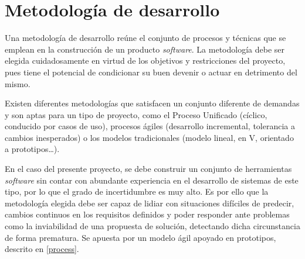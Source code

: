 \section{Metodología de desarrollo}

Una metodología de desarrollo reúne el conjunto de procesos y técnicas que se emplean en la construcción de un producto \textit{software}. La metodología debe ser elegida cuidadosamente en virtud de los objetivos y restricciones del proyecto, pues tiene el potencial de condicionar su buen devenir o actuar en detrimento del mismo.

Existen diferentes metodologías que satisfacen un conjunto diferente de demandas y son aptas para un tipo de proyecto, como el Proceso Unificado (cíclico, conducido por casos de uso), procesos ágiles (desarrollo incremental, tolerancia a cambios inesperados) o los modelos tradicionales (modelo lineal, en V, orientado a prototipos\dots).

En el caso del presente proyecto, se debe construir un conjunto de herramientas \textit{software} sin contar con abundante experiencia en el desarrollo de sistemas de este tipo, por lo que el grado de incertidumbre es muy alto. Es por ello que la metodología elegida debe ser capaz de lidiar con situaciones difíciles de predecir, cambios continuos en los requisitos definidos y poder responder ante problemas como la inviabilidad de una propuesta de solución, detectando dicha circunstancia de forma prematura. Se apuesta por un modelo ágil apoyado en prototipos, descrito en \ref{process}.
